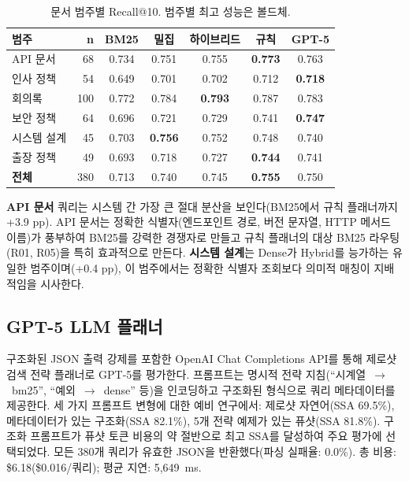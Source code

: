 \documentclass[11pt, a4paper]{article}
\begin{document}
\begin{table}[htbp]
\centering
\caption{문서 범주별 Recall@10. 범주별 최고 성능은 볼드체.}
\label{tab:category}
\begin{tabular}{lrccccc}
\toprule
\textbf{범주} & \textbf{n} & \textbf{BM25} & \textbf{밀집} & \textbf{하이브리드} & \textbf{규칙} & \textbf{GPT-5} \\
\midrule
API 문서      & 68  & 0.734 & 0.751 & 0.755 & \textbf{0.773} & 0.763 \\
인사 정책     & 54  & 0.649 & 0.701 & 0.702 & 0.712 & \textbf{0.718} \\
회의록        & 100 & 0.772 & 0.784 & \textbf{0.793} & 0.787 & 0.783 \\
보안 정책     & 64  & 0.696 & 0.721 & 0.729 & 0.741 & \textbf{0.747} \\
시스템 설계   & 45  & 0.703 & \textbf{0.756} & 0.752 & 0.748 & 0.740 \\
출장 정책     & 49  & 0.693 & 0.718 & 0.727 & \textbf{0.744} & 0.741 \\
\midrule
\textbf{전체} & 380 & 0.713 & 0.740 & 0.745 & \textbf{0.755} & 0.750 \\
\bottomrule
\end{tabular}
\end{table}

\textbf{API 문서} 쿼리는 시스템 간 가장 큰 절대 분산을 보인다(BM25에서 규칙 플래너까지 +3.9 pp). API 문서는 정확한 식별자(엔드포인트 경로, 버전 문자열, HTTP 메서드 이름)가 풍부하여 BM25를 강력한 경쟁자로 만들고 규칙 플래너의 대상 BM25 라우팅(R01, R05)을 특히 효과적으로 만든다. \textbf{시스템 설계}는 Dense가 Hybrid를 능가하는 유일한 범주이며(+0.4 pp), 이 범주에서는 정확한 식별자 조회보다 의미적 매칭이 지배적임을 시사한다.

\subsection{GPT-5 LLM 플래너}

구조화된 JSON 출력 강제를 포함한 OpenAI Chat Completions API를 통해 제로샷 검색 전략 플래너로 GPT-5를 평가한다. 프롬프트는 명시적 전략 지침(``시계열~$\to$~bm25'', ``예외~$\to$~dense'' 등)을 인코딩하고 구조화된 형식으로 쿼리 메타데이터를 제공한다. 세 가지 프롬프트 변형에 대한 예비 연구에서: 제로샷 자연어(SSA 69.5\%), 메타데이터가 있는 구조화(SSA 82.1\%), 5개 전략 예제가 있는 퓨샷(SSA 81.8\%). 구조화 프롬프트가 퓨샷 토큰 비용의 약 절반으로 최고 SSA를 달성하여 주요 평가에 선택되었다. 모든 380개 쿼리가 유효한 JSON을 반환했다(파싱 실패율: 0.0\%). 총 비용: \$6.18(\$0.016/쿼리); 평균 지연: 5,649~ms.
\end{document}
